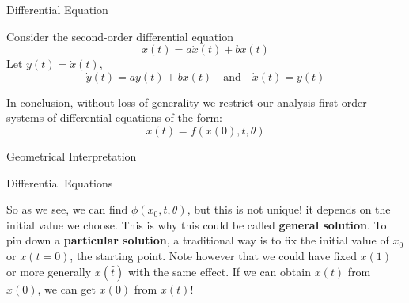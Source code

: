\documentclass[aspectratio=169]{beamer}
\begin{document}
\begin{frame}{Differential Equation}
    \begin{example}
        Consider the second-order differential equation
        \[\ddot{x}(t)=a \dot{x}(t)+bx(t)\]
        Let \(y(t)=\dot{x}(t)\),
        \[\dot{y}(t)=a y(t)+bx(t)\quad \text{and}\quad \dot{x}(t)=y(t)\]
    \end{example}
    
    In conclusion, without loss of generality we restrict our analysis first order systems of differential equations of the form: \[\dot{x}(t)=f(x(0),t,\theta)\]
    
\end{frame}

\begin{frame}{Geometrical Interpretation}
    \begin{center}
    \end{center}
\end{frame}

\begin{frame}{Differential Equations}

So as we see, we can find $\phi(x_0,t,\theta)$, but this is not unique! it depends on the initial value we choose. This is why this could be called \textbf{general solution}. To pin down a \textbf{particular solution}, a traditional way is to fix the initial value of $x_0$ or $x(t=0)$, the starting point. Note however that we could have fixed $x(1)$ or more generally $x(\hat{t})$ with the same effect. If we can obtain $x(t)$ from $x(0)$, we can get $x(0)$ from $x(t)$!
    
\end{frame}
\end{document}
